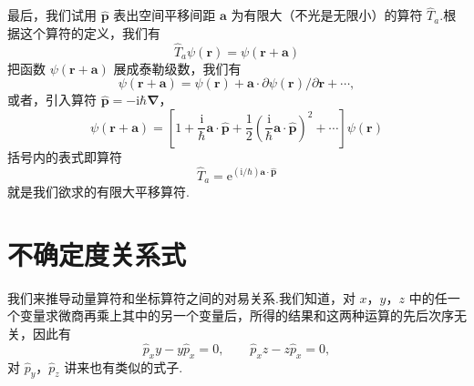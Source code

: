 最后，我们试用 $\hat{\boldsymbol{p}}$ 表出空间平移间距 $\boldsymbol{a}$ 为有限大（不光是无限小）的算符 $\hat{T}_a$.根据这个算符的定义，我们有
\begin{equation*}
  \hat{T}_a\psi(\boldsymbol{r})=\psi(\boldsymbol{r}+\boldsymbol{a})
\end{equation*}
把函数 $\psi(\boldsymbol{r}+\boldsymbol{a})$ 展成泰勒级数，我们有
\begin{equation*}
  \psi(\boldsymbol{r}+\boldsymbol{a})=\psi(\boldsymbol{r})
  +\boldsymbol{a}\cdot\partial\psi(\boldsymbol{r})/\partial\boldsymbol{r}+\cdots,
\end{equation*}
或者，引入算符 $\hat{\boldsymbol{p}}=-\mathrm{i}\hbar\boldsymbol{\nabla}$，
\begin{equation*}
  \psi(\boldsymbol{r}+\boldsymbol{a})=\left[1+\frac{\mathrm{i}}{\hbar}\boldsymbol{a}\cdot\hat{\boldsymbol{p}}
  +\frac{1}{2}\left(\frac{\mathrm{i}}{\hbar}\boldsymbol{a}\cdot\hat{\boldsymbol{p}}\right)^{2}
  +\cdots\right]\psi(\boldsymbol{r})
\end{equation*}
括号内的表式即算符
\begin{equation}
  \hat{T}_a=\mathrm{e}^{(\mathrm{i}/\hbar)\boldsymbol{a}\cdot\hat{\boldsymbol{p}}}
\end{equation}
就是我们欲求的有限大平移算符.

\section{不确定度关系式}

我们来推导动量算符和坐标算符之间的对易关系.我们知道，对 $x$，$y$，$z$ 中的任一个变量求微商再乘上其中的另一个变量后，所得的结果和这两种运算的先后次序无关，因此有
\begin{equation}
  \hat{p}_xy-y\hat{p}_x=0,\qquad
  \hat{p}_xz-z\hat{p}_x=0,
\end{equation}
对 $\hat{p}_y$，$\hat{p}_z$ 讲来也有类似的式子.

